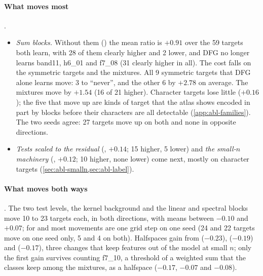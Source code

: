 \paragraph{What moves most} .
\begin{itemize}
\item \emph{Sum blocks.} Without them () the mean ratio is $+0.91$ over the 59 targets both learn, with 28 of them clearly higher and 2 lower, and DFG no longer learns band11, h6\_01 and f7\_08 (31 clearly higher in all). The cost falls on the symmetric targets and the mixtures. All 9 symmetric targets that DFG alone learns move: 3 to ``never'', and the other 6 by $+2.78$ on average. The mixtures move by $+1.54$ (16 of 21 higher). Character targets lose little ($+0.16$); the five that move up are kinds of target that the atlas shows encoded in part by blocks before their characters are all detectable (\cref{app:abl-families}). The two seeds agree: 27 targets move up on both and none in opposite directions.
\item \emph{Tests scaled to the residual} (, $+0.14$; 15 higher, 5 lower) and \emph{the small-$n$ machinery} (, $+0.12$; 10 higher, none lower) come next, mostly on character targets (\cref{sec:abl-smalln,sec:abl-label}).
\end{itemize}

\paragraph{What moves both ways} . The two test levels, the kernel background and the linear and spectral blocks move 10 to 23 targets each, in both directions, with means between $-0.10$ and $+0.07$; for  and  most movements are one grid step on one seed (24 and 22 targets move on one seed only, 5 and 4 on both). Halfspaces gain from  ($-0.23$),  ($-0.19$) and  ($-0.17$), three changes that keep features out of the model at small $n$; only the first gain survives counting f7\_10, a threshold of a weighted sum that the classes keep among the mixtures, as a halfspace ($-0.17$, $-0.07$ and $-0.08$).

